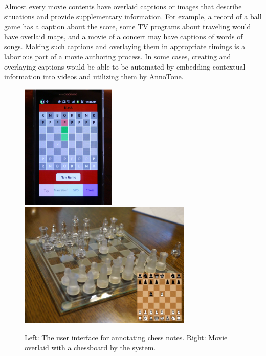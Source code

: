 
Almost every movie contents have overlaid captions or images that describe situations and provide supplementary information.
For example, a record of a ball game has a caption about the score, some TV programs about traveling would have overlaid maps, and a movie of a concert may have captions of words of songs.
Making such captions and overlaying them in appropriate timings is a laborious part of a movie authoring process.
In some cases, creating and overlaying captions would be able to be automated by embedding contextual information into videos and utilizing them by AnnoTone.

\begin{figure}[htbp]
 \begin{center}
  \includegraphics[height=60mm]{application_chess_app.pdf}
  \includegraphics[height=60mm]{application_chess_movie.png}
 \end{center}
 \caption{Left: The user interface for annotating chess notes. Right: Movie overlaid with a chessboard by the system.}
 \label{fig:appl_chss}
\end{figure}

